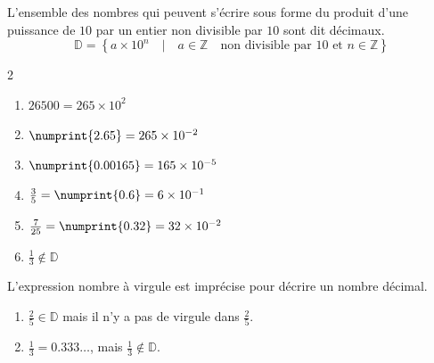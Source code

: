 \documentclass[main.tex]{subfiles}
\begin{document}
\begin{definition}
	L'ensemble des nombres qui peuvent s'écrire sous forme du produit d'une puissance de $10$ par un entier non divisible par $10$ sont dit décimaux. 
	\setlength{\abovedisplayskip}{3pt}
	\setlength{\belowdisplayskip}{3pt}
	$$
	\mathbb{D}=\left\{a\times 10^n \quad \big| \quad  a\in\mathbb{Z}\quad \text{non divisible par 10 et } n\in\mathbb{Z}\right\}
	$$ 
\end{definition}
\begin{example}\label{chap02:example:decimaux} \hfill \vspace{-2em}
	\begin{multicols}{2} 
		\begin{enumerate}[label={\alph*)\rule{0pt}{1.8em}},leftmargin=*]
			\item $26500 = 265 \times 10^2$
			\item $\numprint{2.65}=265\times 10^{-2}$
			\item $\numprint{0.00165}=165\times 10^{-5}$
			\item $\tfrac{3}{5}=\numprint{0.6}=6\times 10^{-1}$
			\item $\tfrac{7}{25}=\numprint{0.32}=32\times 10^{-2}$
			\item $\tfrac{1}{3}\notin \mathbb{D}$
		\end{enumerate} 
	\end{multicols}
\end{example}\vspace{-1em}
\begin{remark} L'expression \og nombre à virgule \fg{} est imprécise pour décrire un nombre décimal. 
	\begin{enumerate}[label={\textbullet\rule{0pt}{1.8em}},leftmargin=*]
		\item $\frac{2}{5}\in \mathbb{D}$ mais il n'y a pas de virgule dans $\frac{2}{5}$.
		\item $\frac{1}{3}=0.333\ldots$, mais $\frac{1}{3}\notin \mathbb{D}$.  
	\end{enumerate} 
\end{remark}
\end{document}
